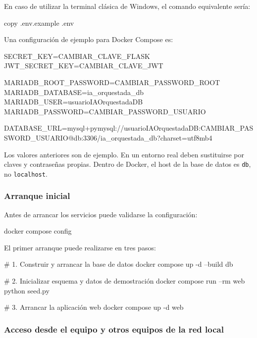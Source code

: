 En caso de utilizar la terminal clásica de Windows, el comando equivalente sería:

\begin{bloqueTerminal}[title={Creación del fichero de entorno en cmd}]
	copy .env.example .env
\end{bloqueTerminal}
Una configuración de ejemplo para Docker Compose es:

\begin{bloqueCodigo}[title={Ejemplo de configuración .env para Docker Compose}]
	SECRET_KEY=CAMBIAR_CLAVE_FLASK
	JWT_SECRET_KEY=CAMBIAR_CLAVE_JWT
	
	MARIADB_ROOT_PASSWORD=CAMBIAR_PASSWORD_ROOT
	MARIADB_DATABASE=ia_orquestada_db
	MARIADB_USER=usuarioIAOrquestadaDB
	MARIADB_PASSWORD=CAMBIAR_PASSWORD_USUARIO
	
	DATABASE_URL=mysql+pymysql://usuarioIAOrquestadaDB:CAMBIAR_PASSWORD_USUARIO@db:3306/ia_orquestada_db?charset=utf8mb4
\end{bloqueCodigo}

Los valores anteriores son de ejemplo. En un entorno real deben sustituirse por claves y contraseñas propias. Dentro de Docker, el host de la base de datos es \texttt{db}, no \texttt{localhost}.

\subsubsection{Arranque inicial}

Antes de arrancar los servicios puede validarse la configuración:

\begin{bloqueTerminal}[title={Validación de Docker Compose}]
	docker compose config
\end{bloqueTerminal}

El primer arranque puede realizarse en tres pasos:

\begin{bloqueTerminal}[title={Primer arranque del sistema}]
	# 1. Construir y arrancar la base de datos
	docker compose up -d --build db
	
	# 2. Inicializar esquema y datos de demostración
	docker compose run --rm web python seed.py
	
	# 3. Arrancar la aplicación web
	docker compose up -d web
\end{bloqueTerminal}

\subsubsection{Acceso desde el equipo y otros equipos de la red local}

